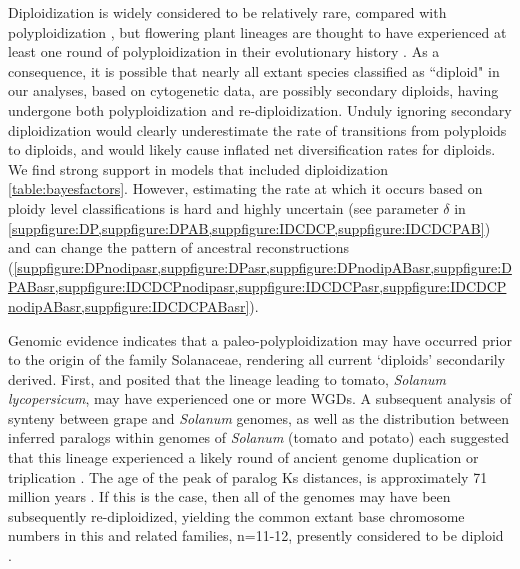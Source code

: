 
Diploidization is widely considered to be relatively rare, compared with polyploidization \citep{husband_2013}, but flowering plant lineages are thought to have experienced at least one round of polyploidization in their evolutionary history \citep{soltis_2015}.
As a consequence, it is possible that nearly all extant species classified as ``diploid" in our analyses, based on cytogenetic data, are possibly secondary diploids, having undergone both polyploidization and re-diploidization.
Unduly ignoring secondary diploidization would clearly underestimate the rate of transitions from polyploids to diploids, and would likely cause inflated net diversification rates for diploids. %
We find strong support in models that included diploidization \cref{table:bayesfactors}. However, estimating the rate at which it occurs based on ploidy level classifications is hard and highly uncertain (see parameter $\delta$ in \cref{suppfigure:DP,suppfigure:DPAB,suppfigure:IDCDCP,suppfigure:IDCDCPAB}) and can change the pattern of ancestral reconstructions (\cref{suppfigure:DPnodipasr,suppfigure:DPasr,suppfigure:DPnodipABasr,suppfigure:DPABasr,suppfigure:IDCDCPnodipasr,suppfigure:IDCDCPasr,suppfigure:IDCDCPnodipABasr,suppfigure:IDCDCPABasr}).

Genomic evidence indicates that a paleo-polyploidization may have occurred prior to the origin of the family Solanaceae, rendering all current `diploids' secondarily derived. 
First, \citet{ku2000} and \citet{blanc2004} posited that the lineage leading to tomato, \textit{Solanum lycopersicum}, may have experienced one or more WGDs.
A subsequent analysis of synteny between grape and \textit{Solanum} genomes, as well as the distribution between inferred paralogs within genomes of \textit{Solanum} (tomato and potato) each suggested that this lineage experienced a likely round of ancient genome duplication or triplication \citep{tomato2012}. 
The age of the peak of paralog Ks distances, is approximately 71 million years \citep{tomato2012}. 
If this is the case, then all of the genomes may have been subsequently re-diploidized, yielding the common extant base chromosome numbers in this and related families, n=11-12, presently considered to be diploid \citep{robertson_2011}. 

